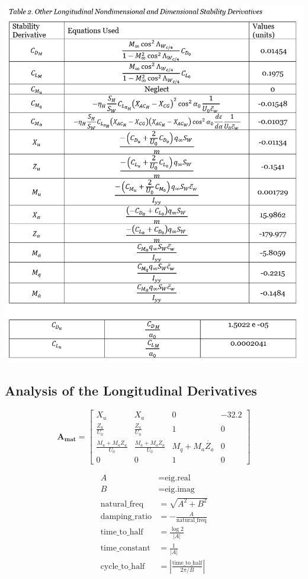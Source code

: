 \documentclass[a4paper, twoside]{article}
\begin{document}
\pagebreak
\begin{center}
\includegraphics[width=\linewidth]{table-2.png}
\end{center}
\pagebreak
\subsection{Analysis of the Longitudinal Derivatives}

\[
\mathbf{A_{\text{mat}}} = \begin{bmatrix}
X_u & X_a & 0 & -32.2 \\
\frac{Z_u}{U_0} & \frac{Z_a}{U_0} & 1 & 0 \\
\frac{M_u + M_a\dot{Z_u}}{U_0} & \frac{M_a + M_a\dot{Z_a}}{U_0} & M_q + M_a\dot{Z_a} & 0 \\
0 & 0 & 1 & 0
\end{bmatrix}
\]


\begin{align*}
A &= \text{eig.real} \\
B &= \text{eig.imag} \\
\text{natural\_freq} &= \sqrt{A^2 + B^2} \\
\text{damping\_ratio} &= -\frac{A}{\text{natural\_freq}} \\
\text{time\_to\_half} &= \frac{\log{2}}{\left|A\right|} \\
\text{time\_constant} &= \frac{1}{\left|A\right|} \\
\text{cycle\_to\_half} &= \left|\frac{\text{time\_to\_half}}{2\pi / B}\right|
\end{align*}
\end{document}
